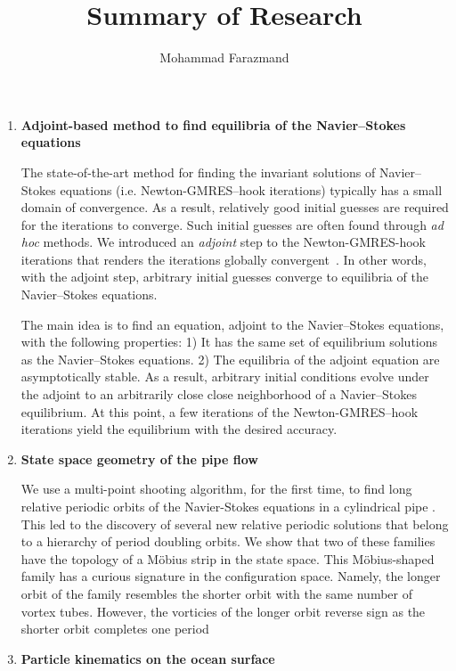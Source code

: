 \documentclass{article}
\title{Summary of Research}
\author{Mohammad Farazmand}
\begin{document}
\maketitle
\begin{enumerate}
\item {\bf Adjoint-based method to find equilibria of the Navier--Stokes equations}

The state-of-the-art method for finding the invariant solutions of Navier--Stokes equations (i.e. Newton-GMRES--hook iterations)
typically has a small domain of convergence. As a result, relatively good initial guesses are required for the iterations to converge.
Such initial guesses are often found through \emph{ad hoc} methods. We introduced an \emph{adjoint} step to the Newton-GMRES-hook iterations
that renders the iterations globally convergent~\cite{Faraz15}. In other words, with the adjoint step, arbitrary initial guesses converge to equilibria of 
the Navier--Stokes equations.

The main idea is to find an equation, adjoint to the Navier--Stokes equations, with the following properties: 1) It has the same set of equilibrium 
solutions as the Navier--Stokes equations. 2) The equilibria of the adjoint equation are asymptotically stable.
As a result, arbitrary initial conditions evolve under the adjoint to an arbitrarily close close neighborhood of a Navier--Stokes equilibrium. 
At this point, a few iterations of the Newton-GMRES--hook iterations yield the equilibrium with the desired accuracy.

\item {\bf State space geometry of the pipe flow}

We use a multi-point shooting algorithm, for the first time, to find long relative periodic orbits of the Navier-Stokes equations in a cylindrical pipe \cite{WFSBC15}.
This led to the discovery of several new relative periodic solutions that belong to a hierarchy 
of period doubling orbits. We show that two of these families have the topology of a M\"obius strip in the state space.
This M\"obius-shaped family has a curious signature in the configuration space. Namely, the longer orbit of the family
resembles the shorter orbit with the same number of vortex tubes. However, the vorticies of the longer orbit reverse sign as the shorter orbit completes one period 

\item{\bf Particle kinematics on the ocean surface}


\end{enumerate}
\end{document}
